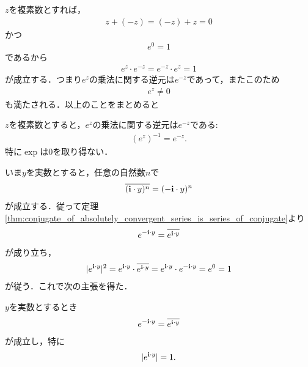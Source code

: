 	$z$を複素数とすれば，
	\begin{align}
		z + (-z) = (-z) + z = 0
	\end{align}
	かつ
	\begin{align}
		e^0 = 1
	\end{align}
	であるから
	\begin{align}
		e^z \cdot e^{-z} = e^{-z} \cdot e^z = 1
	\end{align}
	が成立する．つまり$e^{z}$の乗法に関する逆元は$e^{-z}$であって，またこのため
	\begin{align}
		e^{z} \neq 0
	\end{align}
	も満たされる．以上のことをまとめると
	
	\begin{screen}
		\begin{thm}[$e$のマイナス乗は逆元]\label{thm:inversion_of_exp_z_is_exp_minus_z}
			$z$を複素数とすると，$e^z$の乗法に関する逆元は$e^{-z}$である:
			\begin{align}
				(e^z)^{-1} = e^{-z}.
			\end{align}
			特に$\exp$は$0$を取り得ない．
		\end{thm}
	\end{screen}
	
	いま$y$を実数とすると，任意の自然数$n$で
	\begin{align}
		\overline{(\mathbf{i} \cdot y)^n} = (-\mathbf{i} \cdot y)^n
	\end{align}
	が成立する．従って定理\ref{thm:conjugate_of_absolutely_convergent_series_is_series_of_conjugate}より
	\begin{align}
		e^{-\mathbf{i} \cdot y} = \overline{e^{\mathbf{i} \cdot y}}
	\end{align}
	が成り立ち，
	\begin{align}
		|e^{\mathbf{i} \cdot y}|^2 
		= e^{\mathbf{i} \cdot y} \cdot \overline{e^{\mathbf{i} \cdot y}}
		= e^{\mathbf{i} \cdot y} \cdot e^{-\mathbf{i} \cdot y}
		= e^{0}
		= 1
	\end{align}
	が従う．これで次の主張を得た．
	
	\begin{screen}
		\begin{thm}[$e$の純虚数乗の絶対値は$1$]
			$y$を実数とするとき
			\begin{align}
				e^{-\mathbf{i} \cdot y} = \overline{e^{\mathbf{i} \cdot y}}
			\end{align}
			が成立し，特に
			\begin{align}
				|e^{\mathbf{i} \cdot y}| = 1.
			\end{align}
		\end{thm}
	\end{screen}
	
